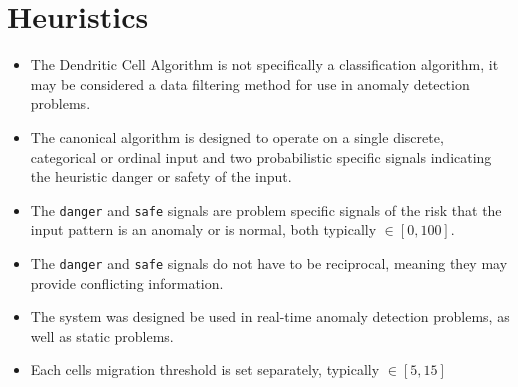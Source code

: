 \documentclass[a4paper, 11pt]{article}
\begin{document}
\section{Heuristics}
\label{sec:heuristics}
\begin{itemize}
	\item The Dendritic Cell Algorithm is not specifically a classification algorithm, it may be considered a data filtering method for use in anomaly detection problems.
	\item The canonical algorithm is designed to operate on a single discrete, categorical or ordinal input and two probabilistic specific signals indicating the heuristic danger or safety of the input.
	\item The \texttt{danger} and \texttt{safe} signals are problem specific signals of the risk that the input pattern is an anomaly or is normal, both typically  $\in [0,100]$.
	\item The \texttt{danger} and \texttt{safe} signals do not have to be reciprocal, meaning they may provide conflicting information.
	\item The system was designed be used in real-time anomaly detection problems, as well as static problems.
	\item Each cells migration threshold is set separately, typically $\in [5,15]$
\end{itemize}

\end{document}
